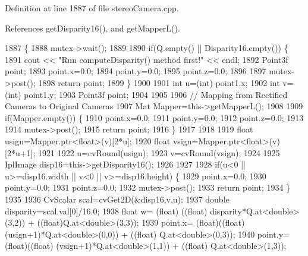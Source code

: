 Definition at line 1887 of file stereo\+Camera.\+cpp.



References get\+Disparity16(), and get\+Mapper\+L().


\begin{DoxyCode}
1887                                                                           \{
1888     mutex->wait();
1889 
1890     \textcolor{keywordflow}{if}(Q.empty() || Disparity16.empty()) \{
1891         cout << \textcolor{stringliteral}{"Run computeDisparity() method first!"} << endl;
1892         Point3f point;
1893         point.x=0.0;
1894         point.y=0.0;
1895         point.z=0.0;
1896 
1897         mutex->post();
1898         \textcolor{keywordflow}{return} point;
1899     \}
1900 
1901     \textcolor{keywordtype}{int} u=(int) point1.x; 
1902     \textcolor{keywordtype}{int} v=(\textcolor{keywordtype}{int}) point1.y;
1903     Point3f point;
1904 
1905 
1906     \textcolor{comment}{// Mapping from Rectified Cameras to Original Cameras}
1907     Mat Mapper=this->getMapperL();
1908 
1909     \textcolor{keywordflow}{if}(Mapper.empty()) \{
1910         point.x=0.0;
1911         point.y=0.0;
1912         point.z=0.0;
1913        
1914         mutex->post();
1915         \textcolor{keywordflow}{return} point;
1916     \}
1917 
1918 
1919     \textcolor{keywordtype}{float} usign=Mapper.ptr<\textcolor{keywordtype}{float}>(v)[2*u];
1920     \textcolor{keywordtype}{float} vsign=Mapper.ptr<\textcolor{keywordtype}{float}>(v)[2*u+1]; 
1921 
1922     u=cvRound(usign);
1923     v=cvRound(vsign);
1924 
1925     IplImage disp16=this->getDisparity16();
1926     
1927 
1928     \textcolor{keywordflow}{if}(u<0 || u>=disp16.width || v<0 || v>=disp16.height) \{
1929         point.x=0.0;
1930         point.y=0.0;
1931         point.z=0.0;
1932         mutex->post();
1933         \textcolor{keywordflow}{return} point;
1934     \}
1935 
1936     CvScalar scal=cvGet2D(&disp16,v,u);
1937     \textcolor{keywordtype}{double} disparity=scal.val[0]/16.0;
1938     \textcolor{keywordtype}{float} w= (float) ((\textcolor{keywordtype}{float}) disparity*Q.at<\textcolor{keywordtype}{double}>(3,2)) + ((float)Q.at<\textcolor{keywordtype}{double}>(3,3));
1939     point.x= (float)((\textcolor{keywordtype}{float}) (usign+1)*Q.at<\textcolor{keywordtype}{double}>(0,0)) + ((\textcolor{keywordtype}{float}) Q.at<\textcolor{keywordtype}{double}>(0,3));
1940     point.y=(float)((\textcolor{keywordtype}{float}) (vsign+1)*Q.at<\textcolor{keywordtype}{double}>(1,1)) + ((\textcolor{keywordtype}{float}) Q.at<\textcolor{keywordtype}{double}>(1,3));

\end{DoxyCode}
